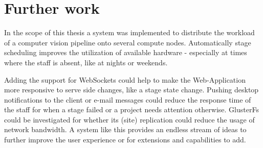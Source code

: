 \chapter{Further work}

In the scope of this thesis a system was implemented to distribute the workload of a computer vision pipeline onto several compute nodes.
Automatically stage scheduling improves the utilization of available hardware - especially at times where the staff is absent, like at nights or weekends.

Adding the support for WebSockets could help to make the Web-Application more responsive to serve side changes, like a stage state change.
Pushing desktop notifications to the client or e-mail messages could reduce the response time of the staff for when a stage failed or a project needs attention otherwise.
GlusterFs could be investigated for whether its (site) replication could reduce the usage of network bandwidth.
A system like this provides an endless stream of ideas to further improve the user experience or for extensions and capabilities to add.